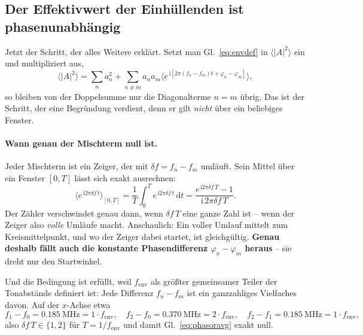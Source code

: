 \documentclass[11pt,a4paper]{article}
\begin{document}
\subsection{Der Effektivwert der Einhüllenden ist phasenunabhängig}\label{sec:rmsphase}

Jetzt der Schritt, der alles Weitere erklärt. Setzt man Gl.~\eqref{eq:envdef}
in $\langle|A|^2\rangle$ ein und multipliziert aus,
\begin{equation}
  \bigl\langle |A|^2 \bigr\rangle
  = \sum_n a_n^2
  + \sum_{n\neq m} a_n a_m
    \bigl\langle e^{\,\mathrm{i}\left[2\pi(f_n-f_m)t+\varphi_n-\varphi_m\right]}\bigr\rangle ,
\end{equation}
so bleiben von der Doppelsumme nur die Diagonalterme $n=m$ übrig. Das ist
der Schritt, der eine Begründung verdient, denn er gilt \emph{nicht} über ein
beliebiges Fenster.

\paragraph{Wann genau der Mischterm null ist.}
Jeder Mischterm ist ein Zeiger, der mit $\delta\! f = f_n-f_m$ umläuft. Sein
Mittel über ein Fenster $[0,T]$ lässt sich exakt ausrechnen:
\begin{equation}
  \bigl\langle e^{\,\mathrm{i}2\pi \delta\! f\, t}\bigr\rangle_{[0,T]}
  = \frac{1}{T}\int_0^{T} e^{\,\mathrm{i}2\pi \delta\! f\, t}\,\mathrm{d}t
  = \frac{e^{\,\mathrm{i}2\pi \delta\! f\, T}-1}{\mathrm{i}\,2\pi \delta\! f\, T} .
  \label{eq:phasoravg}
\end{equation}
Der Zähler verschwindet genau dann, wenn $\delta\! f\,T$ eine ganze Zahl ist
-- wenn der Zeiger also \emph{volle} Umläufe macht. Anschaulich: Ein voller
Umlauf mittelt zum Kreismittelpunkt, und wo der Zeiger dabei startet, ist
gleichgültig. \textbf{Genau deshalb fällt auch die konstante Phasendifferenz
$\varphi_n-\varphi_m$ heraus} -- sie dreht nur den Startwinkel.

Und die Bedingung ist erfüllt, weil $f_\mathrm{env}$ als größter gemeinsamer
Teiler der Tonabstände definiert ist: Jede Differenz $f_n-f_m$ ist ein
ganzzahliges Vielfaches davon. Auf der $x$-Achse etwa
\begin{equation}
  f_1-f_0 = \SI{0.185}{\mega\hertz} = 1\cdot f_\mathrm{env},\quad
  f_2-f_0 = \SI{0.370}{\mega\hertz} = 2\cdot f_\mathrm{env},\quad
  f_2-f_1 = \SI{0.185}{\mega\hertz} = 1\cdot f_\mathrm{env},
\end{equation}
also $\delta\! f\,T \in \{1,2\}$ für $T=1/f_\mathrm{env}$ und damit
Gl.~\eqref{eq:phasoravg} exakt null.
\end{document}
